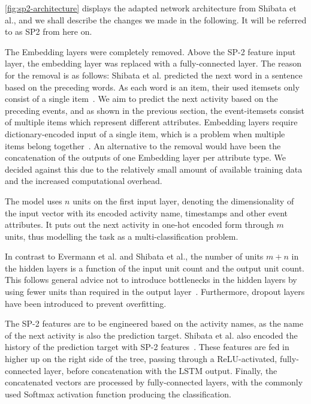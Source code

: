 \autoref{fig:sp2-architecture} displays the adapted network architecture from Shibata et al., and we shall describe the changes we made in the following. It will be referred to as SP2 from here on.

The Embedding layers were completely removed. Above the SP-2 feature input layer, the embedding layer was replaced with a fully-connected layer. The reason for the removal is as follows: Shibata et al. predicted the next word in a sentence based on the preceding words. As each word is an item, their used itemsets only consist of a single item~\cite{shibata2016bipartite}. We aim to predict the next activity based on the preceding events, and as shown in the previous section, the event-itemsets consist of multiple items which represent different attributes.
Embedding layers require dictionary-encoded input of a single item, which is a problem when multiple items belong together~\cite{goldberg2014word2vec}. An alternative to the removal would have been the concatenation of the outputs of one Embedding layer per attribute type. We decided against this due to the relatively small amount of available training data and the increased computational overhead.

The model uses $n$ units on the first input layer, denoting the dimensionality of the input vector with its encoded activity name, timestamps and other event attributes. It puts out the next activity in one-hot encoded form through $m$ units, thus modelling the task as a multi-classification problem.

In contrast to Evermann et al. and Shibata et al., the number of units $m+n$ in the hidden layers is a function of the input unit count and the output unit count. This follows general advice not to introduce bottlenecks in the hidden layers by using fewer units than required in the output layer~\cite{web:techniques-in-convnets,szegedy2016rethinking}. Furthermore, dropout layers have been introduced to prevent overfitting.

The SP-2 features are to be engineered based on the activity names, as the name of the next activity is also the prediction target. Shibata et al. also encoded the history of the prediction target with SP-2 features~\cite{shibata2016bipartite}. These features are fed in higher up on the right side of the tree, passing through a ReLU-activated, fully-connected layer, before concatenation with the LSTM output. Finally, the concatenated vectors are processed by fully-connected layers, with the commonly used Softmax activation function producing the classification.


